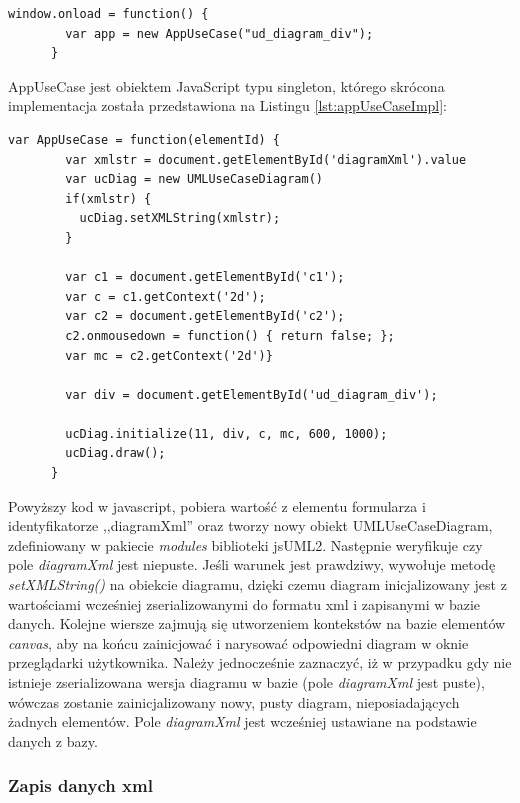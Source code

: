       \begin{lstlisting}[caption={Widok requriement/edit.gsp}, label={lst:appUseCase}]
      window.onload = function() {
        var app = new AppUseCase("ud_diagram_div");
      }

      \end{lstlisting}

      \newpage

      AppUseCase jest obiektem JavaScript typu singleton, którego skrócona implementacja została przedstawiona na Listingu \ref{lst:appUseCaseImpl}: 
    
      \begin{lstlisting}[caption={Implementacja obiektu JS AppUseCase}, label={lst:appUseCaseImpl}]
      var AppUseCase = function(elementId) { 
        var xmlstr = document.getElementById('diagramXml').value
        var ucDiag = new UMLUseCaseDiagram() 
        if(xmlstr) {
          ucDiag.setXMLString(xmlstr);
        }

        var c1 = document.getElementById('c1');
        var c = c1.getContext('2d');
        var c2 = document.getElementById('c2');
        c2.onmousedown = function() { return false; };
        var mc = c2.getContext('2d')}

        var div = document.getElementById('ud_diagram_div');

        ucDiag.initialize(11, div, c, mc, 600, 1000);
        ucDiag.draw();
      }
      \end{lstlisting}

      Powyższy kod w javascript, pobiera wartość z elementu formularza i identyfikatorze ,,diagramXml'' oraz tworzy nowy obiekt UMLUseCaseDiagram, zdefiniowany w pakiecie \emph{modules} biblioteki jsUML2. Następnie weryfikuje czy pole \emph{diagramXml} jest niepuste. Jeśli warunek jest prawdziwy, wywołuje metodę \emph{setXMLString()} na obiekcie diagramu, dzięki czemu diagram inicjalizowany jest z wartościami wcześniej zserializowanymi do formatu xml i zapisanymi w bazie danych. Kolejne wiersze zajmują się utworzeniem kontekstów na bazie elementów \emph{canvas}, aby na końcu zainicjować i narysować odpowiedni diagram w oknie przeglądarki użytkownika. Należy jednocześnie zaznaczyć, iż w przypadku gdy nie istnieje zserializowana wersja diagramu w bazie (pole \emph{diagramXml} jest puste), wówczas zostanie zainicjalizowany nowy, pusty diagram, nieposiadających żadnych elementów. Pole \emph{diagramXml} jest wcześniej ustawiane na podstawie danych z bazy.

      \subsubsection{Zapis danych xml}


